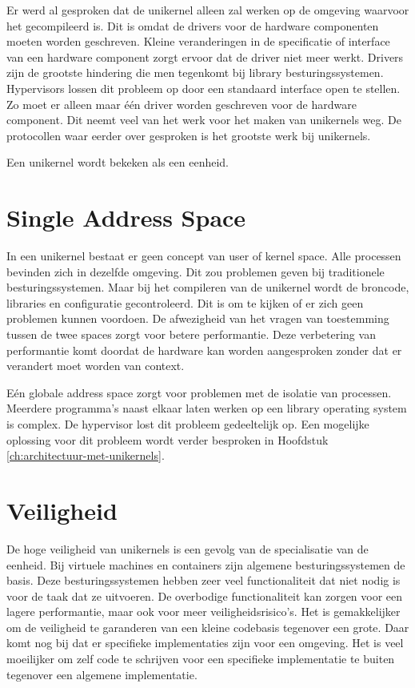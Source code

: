 \documentclass[pdftex,a4paper,12pt,twoside]{report}
\begin{document}
Er werd al gesproken dat de unikernel alleen zal werken op de omgeving waarvoor het gecompileerd is. Dit is omdat de drivers voor de hardware componenten moeten worden geschreven. Kleine veranderingen in de specificatie of interface van een hardware component zorgt ervoor dat de driver niet meer werkt. Drivers zijn de grootste hindering die men tegenkomt bij library besturingssystemen. Hypervisors lossen dit probleem op door een standaard interface open te stellen. Zo moet er alleen maar één driver worden geschreven voor de hardware component. Dit neemt veel van het werk voor het maken van unikernels weg. De protocollen waar eerder over gesproken is het grootste werk bij unikernels.

Een unikernel wordt bekeken als een eenheid.

\section{Single Address Space}

In een unikernel bestaat er geen concept van user of kernel space. Alle processen bevinden zich in dezelfde omgeving. Dit zou problemen geven bij traditionele besturingssystemen. Maar bij het compileren van de unikernel wordt de broncode, libraries en configuratie gecontroleerd. Dit is om te kijken of er zich geen problemen kunnen voordoen. De afwezigheid van het vragen van toestemming tussen de twee spaces zorgt voor betere performantie. Deze verbetering van performantie komt doordat de hardware kan worden aangesproken zonder dat er verandert moet worden van context.

Eén globale address space zorgt voor problemen met de isolatie van processen. Meerdere programma's naast elkaar laten werken op een library operating system is complex. De hypervisor lost dit probleem gedeeltelijk op. Een mogelijke oplossing voor dit probleem wordt verder besproken in Hoofdstuk \ref{ch:architectuur-met-unikernels}.

\section{Veiligheid}

De hoge veiligheid van unikernels is een gevolg van de specialisatie van de eenheid. Bij virtuele machines en containers zijn algemene besturingssystemen de basis. Deze besturingssystemen hebben zeer veel functionaliteit dat niet nodig is voor de taak dat ze uitvoeren. De overbodige functionaliteit kan zorgen voor een lagere performantie, maar ook voor meer veiligheidsrisico's. Het is gemakkelijker om de veiligheid te garanderen van een kleine codebasis tegenover een grote. Daar komt nog bij dat er specifieke implementaties zijn voor een omgeving. Het is veel moeilijker om zelf code te schrijven voor een specifieke implementatie te buiten tegenover een algemene implementatie.
\end{document}
